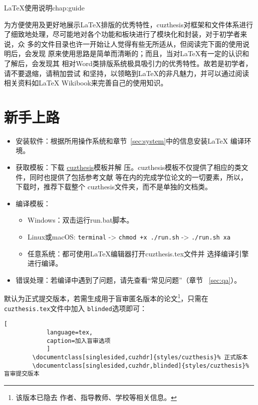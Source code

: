 \begin{cuzchapter}{\LaTeX{}使用说明}{chap:guide}

    为方便使用及更好地展示\LaTeX{}排版的优秀特性，cuzthesis对框架和文件体系进行
    了细致地处理，尽可能地对各个功能和板块进行了模块化和封装，对于初学者来说，众
    多的文件目录也许一开始让人觉得有些无所适从，但阅读完下面的使用说明后，会发现
    原来使用思路是简单而清晰的；而且，当对\LaTeX{}有一定的认识和了解后，会发现其
    相对Word类排版系统极具吸引力的优秀特性。故若是初学者，请不要退缩，请稍加尝试
    和坚持，以领略到\LaTeX{}的非凡魅力，并可以通过阅读相关资料如\LaTeX{}
    Wikibook\citep{wikibook2014latex}来完善自己的使用知识。

    \section{新手上路}\label{sec:newbie}

    \begin{itemize}
        \item 安装软件：根据所用操作系统和章节~\ref{sec:system}中的信息安装\LaTeX{}
              编译环境。
        \item 获取模板：下载
              \href{https://github.com/xiehao/CUZThesis}{cuzthesis}模板并解
              压。cuzthesis模板不仅提供了相应的类文件，同时也提供了包括参考文献
              等在内的完成学位论文的一切要素，所以，下载时，推荐下载整个
              cuzthesis文件夹，而不是单独的文档类。
        \item 编译模板：
              \begin{itemize}
                  \item Windows：双击运行run.bat脚本。
                  \item Linux或macOS: {\small \verb|terminal| -> \verb|chmod +x ./run.sh| -> \verb|./run.sh xa|}
                  \item 任意系统：都可使用\LaTeX{}编辑器打开cuzthesis.tex文件并
                        选择编译引擎进行编译。
              \end{itemize}
        \item 错误处理：若编译中遇到了问题，请先查看“常见问题”（章节
              ~\ref{sec:qa}）。
    \end{itemize}

    默认为正式提交版本，若需生成用于盲审匿名版本的论文\footnote{该版本已隐去
        作者、指导教师、学校等相关信息。}，只需在\texttt{cuzthesis.tex}文件中加入
    \texttt{blinded}选项即可：
    \begin{lstlisting}[
            language=tex,
            caption=加入盲审选项
            ]
        \documentclass[singlesided,cuzhdr]{styles/cuzthesis}% 正式版本
        \documentclass[singlesided,cuzhdr,blinded]{styles/cuzthesis}% 盲审提交版本
    \end{lstlisting}


\end{cuzchapter}
